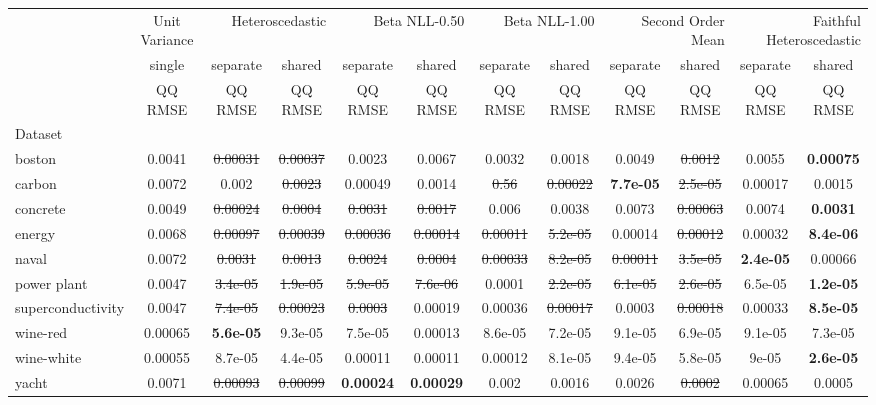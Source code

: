 \begin{tabular}{l|c|cc|cc|cc|cc|cc}
\toprule
{} & {Unit Variance} & \multicolumn{2}{r}{Heteroscedastic} & \multicolumn{2}{r}{Beta NLL-0.50} & \multicolumn{2}{r}{Beta NLL-1.00} & \multicolumn{2}{r}{Second Order Mean} & \multicolumn{2}{r}{Faithful Heteroscedastic} \\
{} & {single} & {separate} & {shared} & {separate} & {shared} & {separate} & {shared} & {separate} & {shared} & {separate} & {shared} \\
{} & {QQ RMSE} & {QQ RMSE} & {QQ RMSE} & {QQ RMSE} & {QQ RMSE} & {QQ RMSE} & {QQ RMSE} & {QQ RMSE} & {QQ RMSE} & {QQ RMSE} & {QQ RMSE} \\
{Dataset} & {} & {} & {} & {} & {} & {} & {} & {} & {} & {} & {} \\
\midrule
boston & 0.0041 & \sout{0.00031} & \sout{0.00037} & 0.0023 & 0.0067 & 0.0032 & 0.0018 & 0.0049 & \sout{0.0012} & 0.0055 & \textbf{0.00075} \\
carbon & 0.0072 & 0.002 & \sout{0.0023} & 0.00049 & 0.0014 & \sout{0.56} & \sout{0.00022} & \textbf{7.7e-05} & \sout{2.5e-05} & 0.00017 & 0.0015 \\
concrete & 0.0049 & \sout{0.00024} & \sout{0.0004} & \sout{0.0031} & \sout{0.0017} & 0.006 & 0.0038 & 0.0073 & \sout{0.00063} & 0.0074 & \textbf{0.0031} \\
energy & 0.0068 & \sout{0.00097} & \sout{0.00039} & \sout{0.00036} & \sout{0.00014} & \sout{0.00011} & \sout{5.2e-05} & 0.00014 & \sout{0.00012} & 0.00032 & \textbf{8.4e-06} \\
naval & 0.0072 & \sout{0.0031} & \sout{0.0013} & \sout{0.0024} & \sout{0.0004} & \sout{0.00033} & \sout{8.2e-05} & \sout{0.00011} & \sout{3.5e-05} & \textbf{2.4e-05} & 0.00066 \\
power plant & 0.0047 & \sout{3.4e-05} & \sout{1.9e-05} & \sout{5.9e-05} & \sout{7.6e-06} & 0.0001 & \sout{2.2e-05} & \sout{6.1e-05} & \sout{2.6e-05} & 6.5e-05 & \textbf{1.2e-05} \\
superconductivity & 0.0047 & \sout{7.4e-05} & \sout{0.00023} & \sout{0.0003} & 0.00019 & 0.00036 & \sout{0.00017} & 0.0003 & \sout{0.00018} & 0.00033 & \textbf{8.5e-05} \\
wine-red & 0.00065 & \textbf{5.6e-05} & 9.3e-05 & 7.5e-05 & 0.00013 & 8.6e-05 & 7.2e-05 & 9.1e-05 & 6.9e-05 & 9.1e-05 & 7.3e-05 \\
wine-white & 0.00055 & 8.7e-05 & 4.4e-05 & 0.00011 & 0.00011 & 0.00012 & 8.1e-05 & 9.4e-05 & 5.8e-05 & 9e-05 & \textbf{2.6e-05} \\
yacht & 0.0071 & \sout{0.00093} & \sout{0.00099} & \textbf{0.00024} & \textbf{0.00029} & 0.002 & 0.0016 & 0.0026 & \sout{0.0002} & 0.00065 & 0.0005 \\
\bottomrule
\end{tabular}
